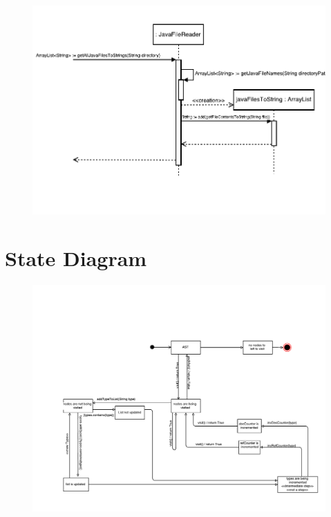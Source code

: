 \documentclass[12p]{article}
\begin{document}
\begin{figure}
  \includegraphics[width=1.0\textwidth]{getAllJavaFilesToString.pdf}
  \caption{} %
  \label{fig:sequence2}
\end{figure}

\newpage

\section{State Diagram}
\begin{figure}[H]
  \includegraphics[width=1.0\textwidth]{State_diagram.pdf}
  \caption{} %
  \label{fig:state}
\end{figure}
\end{document}
